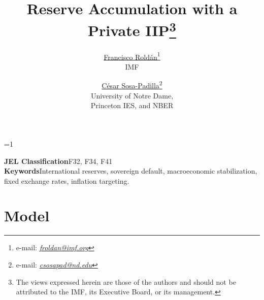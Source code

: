 
\linespread{1.32} %

\def\acknowledgements{}

\title{Reserve Accumulation with a Private IIP\thanks{The views expressed herein are those of the authors and should not be attributed to the IMF, its Executive Board, or its management. \acknowledgements}}

\author{\href{https://fqroldan.github.io}{Francisco Rold\'{a}n}\thanks{e-mail: \href{mailto:froldan@imf.org}{\emph{froldan@imf.org}}}\\IMF \and \href{https://sosapadilla.github.io}{C\'{e}sar Sosa-Padilla}\thanks{e-mail: \href{mailto:csosapad@nd.edu}{\emph{csosapad@nd.edu}}} \\University of Notre Dame,\\ Princeton IES, and NBER}

\ifdefined\ungated
\else
\def\ungated{1}
\fi

\date{\monthname\xspace \the\year %
}


\ifnum\ungated=1%
	\maketitle 
	\begin{abstract}
		\noindent
	\end{abstract}
	\vfill
	\noindent\textbf{JEL Classification}\quad F32, F34, F41\\
	\noindent\textbf{Keywords}\quad International reserves, sovereign default, macroeconomic stabilization, fixed exchange rates, inflation targeting.
	\bigskip
	\vfill
\else
	
	\tableofcontents
\fi
\pagebreak 

\intro


\section{Model}


